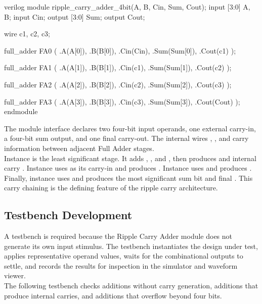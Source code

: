 \begin{codeblock}{verilog}
module ripple_carry_adder_4bit(A, B, Cin, Sum, Cout);
    input [3:0] A, B;
    input Cin;
    output [3:0] Sum;
    output Cout;

    wire c1, c2, c3;

    full_adder FA0 (
        .A(A[0]),
        .B(B[0]),
        .Cin(Cin),
        .Sum(Sum[0]),
        .Cout(c1)
    );

    full_adder FA1 (
        .A(A[1]),
        .B(B[1]),
        .Cin(c1),
        .Sum(Sum[1]),
        .Cout(c2)
    );

    full_adder FA2 (
        .A(A[2]),
        .B(B[2]),
        .Cin(c2),
        .Sum(Sum[2]),
        .Cout(c3)
    );

    full_adder FA3 (
        .A(A[3]),
        .B(B[3]),
        .Cin(c3),
        .Sum(Sum[3]),
        .Cout(Cout)
    );
endmodule
\end{codeblock}

\noindent The module interface declares two four-bit input operands, one external carry-in, a
four-bit sum output, and one final carry-out. The internal wires , ,
and  carry information between adjacent Full Adder stages.\\

\noindent Instance  is the least significant stage. It adds ,
, and , then produces  and internal carry
. Instance  uses  as its carry-in and produces
. Instance  uses  and produces .
Finally, instance  uses  and produces the most significant sum bit
and final . This carry chaining is the defining feature of the ripple carry
architecture.

\subsection{Testbench Development}
A testbench is required because the Ripple Carry Adder module does not generate its own input
stimulus. The testbench instantiates the design under test, applies representative operand values,
waits for the combinational outputs to settle, and records the results for inspection in the
simulator and waveform viewer.\\

\noindent The following testbench checks additions without carry generation, additions that produce
internal carries, and additions that overflow beyond four bits.

